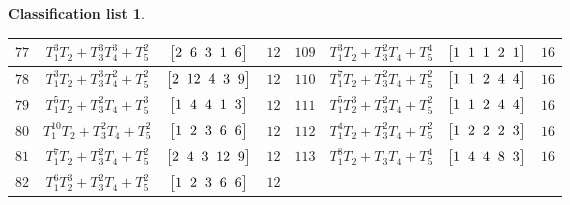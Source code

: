 \documentclass[pdftex]{sigma}%
\theoremstyle{definition}
\newtheorem{class-list}[thm]{Classification list}
\numberwithin{equation}{section}
\begin{document}
\begin{class-list}
\begin{table}[t!]
\begin{tabu}{c|c|c|c||c|c|c|c}
\\
\hline
${77}$&${T_{1}^{3}T_{2}+T_{3}^{3}T_{4}^{3}+T_{5}^{2}}$
&$\arraycolsep=1mm\begin{bmatrix}{2} & {6} & {3} & {1} & {6}\end{bmatrix}$&${12}$
&${109}$&${T_{1}^{3}T_{2}+T_{3}^{2}T_{4}+T_{5}^{4}}$
&$\arraycolsep=1mm\begin{bmatrix}{1} & {1} & {1} & {2} & {1}\end{bmatrix}$&${16}$
\\
\hline
${78}$&${T_{1}^{3}T_{2}+T_{3}^{3}T_{4}^{2}+T_{5}^{2}}$
&$\arraycolsep=1mm\begin{bmatrix}{2} & {12} & {4} & {3} & {9}\end{bmatrix}$&${12}$
&${110}$&${T_{1}^{7}T_{2}+T_{3}^{2}T_{4}+T_{5}^{2}}$
&$\arraycolsep=1mm\begin{bmatrix}{1} & {1} & {2} & {4} & {4}\end{bmatrix}$&${16}$
\\
\hline
${79}$&${T_{1}^{5}T_{2}+T_{3}^{2}T_{4}+T_{5}^{3}}$
&$\arraycolsep=1mm\begin{bmatrix}{1} & {4} & {4} & {1} & {3}\end{bmatrix}$&${12}$
&${111}$&${T_{1}^{5}T_{2}^{3}+T_{3}^{2}T_{4}+T_{5}^{2}}$
&$\arraycolsep=1mm\begin{bmatrix}{1} & {1} & {2} & {4} & {4}\end{bmatrix}$&${16}$
\\
\hline
${80}$&${T_{1}^{10}T_{2}+T_{3}^{2}T_{4}+T_{5}^{2}}$
&$\arraycolsep=1mm\begin{bmatrix}{1} & {2} & {3} & {6} & {6}\end{bmatrix}$&${12}$
&${112}$&${T_{1}^{4}T_{2}+T_{3}^{2}T_{4}+T_{5}^{2}}$
&$\arraycolsep=1mm\begin{bmatrix}{1} & {2} & {2} & {2} & {3}\end{bmatrix}$&${16}$
\\
\hline
${81}$&${T_{1}^{7}T_{2}+T_{3}^{2}T_{4}+T_{5}^{2}}$
&$\arraycolsep=1mm\begin{bmatrix}{2} & {4} & {3} & {12} & {9}\end{bmatrix}$&${12}$
&${113}$&${T_{1}^{8}T_{2}+T_{3}T_{4}+T_{5}^{4}}$
&$\arraycolsep=1mm\begin{bmatrix}{1} & {4} & {4} & {8} & {3}\end{bmatrix}$&${16}$
\\
\hline
${82}$&${T_{1}^{6}T_{2}^{3}+T_{3}^{2}T_{4}+T_{5}^{2}}$
&$\arraycolsep=1mm\begin{bmatrix}{1} & {2} & {3} & {6} & {6}\end{bmatrix}$&${12}$

\end{tabu}
\end{table}
\end{class-list}
\end{document}
